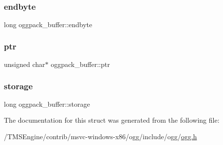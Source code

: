 \mbox{\label{structoggpack__buffer_a416200dd77da3603dce3913826d74207}} 
\subsubsection{\texorpdfstring{endbyte}{endbyte}}
{\footnotesize\ttfamily long oggpack\+\_\+buffer\+::endbyte}

\mbox{\label{structoggpack__buffer_a479984d9646e0fba6da8aff21e5c3b64}} 
\subsubsection{\texorpdfstring{ptr}{ptr}}
{\footnotesize\ttfamily unsigned char$\ast$ oggpack\+\_\+buffer\+::ptr}

\mbox{\label{structoggpack__buffer_a1eea2afb662c8080a902d224773fee4e}} 
\subsubsection{\texorpdfstring{storage}{storage}}
{\footnotesize\ttfamily long oggpack\+\_\+buffer\+::storage}



The documentation for this struct was generated from the following file\+:\begin{DoxyCompactItemize}
\item 
/\+T\+M\+S\+Engine/contrib/msvc-\/windows-\/x86/ogg/include/ogg/\hyperlink{ogg_8h}{ogg.\+h}\end{DoxyCompactItemize}
